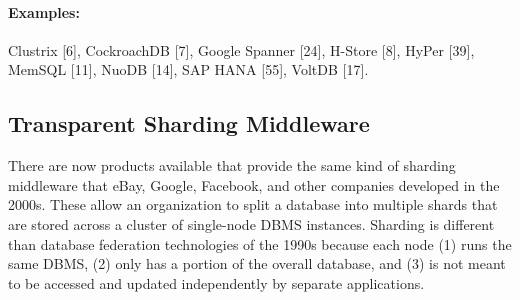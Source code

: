 \documentclass[a4paper,11pt,twoside,openright]{article}
\begin{document}
\paragraph*{Examples:} Clustrix {[}6{]}, CockroachDB {[}7{]}, Google Spanner
{[}24{]}, H-Store {[}8{]}, HyPer {[}39{]}, MemSQL {[}11{]}, NuoDB
{[}14{]}, SAP HANA {[}55{]}, VoltDB {[}17{]}.

\hypertarget{transparent-sharding-middleware}{%
\subsection{Transparent Sharding
Middleware}\label{transparent-sharding-middleware}}

There are now products available that provide the same kind of sharding
middleware that eBay, Google, Facebook, and other companies developed in
the 2000s. These allow an organization to split a database into multiple
shards that are stored across a cluster of single-node DBMS instances.
Sharding is different than database federation technologies of the 1990s
because each node (1) runs the same DBMS, (2) only has a portion of the
overall database, and (3) is not meant to be accessed and updated
independently by separate applications.
\end{document}

